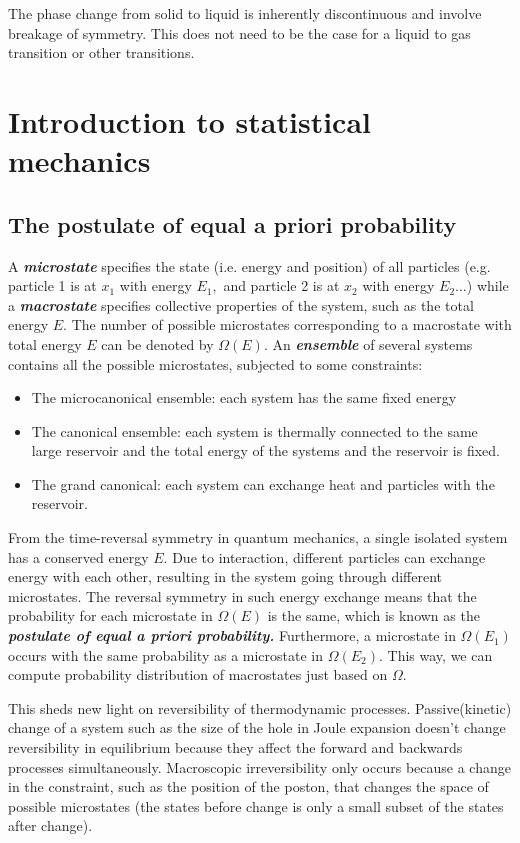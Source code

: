 \documentclass{article}
\theoremstyle{nonumberplain}
\begin{document}
The phase change from solid to liquid is inherently discontinuous and involve breakage of symmetry. This does not need to be the case for a liquid to gas transition or other transitions. 

\section{Introduction to statistical mechanics}
\subsection{The postulate of equal a priori probability}
A \textit{\textbf{microstate}}  specifies the state (i.e. energy and position) of all particles (e.g. particle 1 is at $x_1$ with energy $E_1,$ and particle 2 is at $x_2$ with energy $E_2\ldots  $) while a \textit{\textbf{macrostate}} specifies collective properties of the system, such as the total energy $E.$ The number of possible microstates corresponding to a macrostate with total energy $E$ can be denoted by $\Omega(E).$ An \textit{\textbf{ensemble}} of several systems contains all the possible microstates, subjected to some constraints:
\begin{itemize}
    \item The microcanonical ensemble: each system has the same fixed energy 
    \item The canonical ensemble: each system is thermally connected to the same large reservoir and the total energy of the systems and the reservoir is fixed. 
    \item The grand canonical: each system can exchange heat and particles with the reservoir. 
\end{itemize}

From the time-reversal symmetry in quantum mechanics, a single isolated system has a conserved energy $E$. Due to interaction, different particles can exchange energy with each other, resulting in the system going through different microstates. The reversal symmetry in such energy exchange means that the probability for each microstate in $\Omega(E)$ is the same, which is known as the \textit{\textbf{postulate of equal a priori probability.}} Furthermore, a microstate in $\Omega(E_1)$ occurs with the same probability as a microstate in $\Omega(E_2).$ This way, we can compute probability distribution of macrostates just based on $\Omega.$

This sheds new light on reversibility of thermodynamic processes. Passive(kinetic) change of a system such as the size of the hole in Joule expansion doesn't change reversibility in equilibrium because they affect the forward and backwards processes simultaneously. Macroscopic irreversibility only occurs because a change in the constraint, such as the position of the poston, that changes the space of possible microstates (the states before change is only a small subset of the states after change). 
\end{document}
